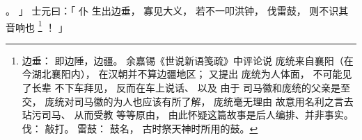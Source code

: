     。
」
士元曰：「
    仆
    生出边垂，
    寡见大义，
    若不一叩洪钟，
    伐雷鼓，
    则不识其音响也%
    \footnote{%
        边垂：
            即边陲，边疆。
            余嘉锡《世说新语笺疏》中评论说
            庞统来自襄阳（在今湖北襄阳内），
            在汉朝并不算边疆地区；
            又提出
            庞统为人体面，
            不可能见了长辈
            不下车拜见，
            反而在车上说话、
            以及
            由于
            司马徽和庞统的父亲是至交，
            庞统对司马徽的为人也应该有所了解，
            庞统毫无理由
            故意用名利之言去玷污司马、
            从而受教
            等等原由，
            由此怀疑这篇故事是后人编排、并非事实。
        伐：
            敲打。
        雷鼓：
            鼓名，
            古时祭天神时所用的鼓。
    }%
    ！
」

\switchcolumn


 
